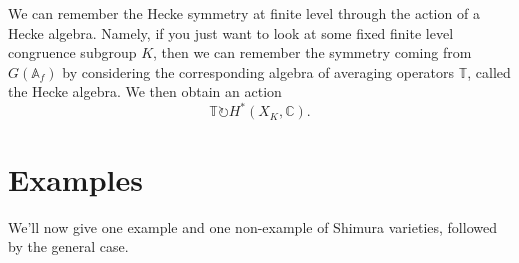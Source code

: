 \documentclass[reqno]{amsart} 
\begin{document}
We can remember the Hecke symmetry at finite level through the action of a Hecke algebra.  Namely, if you just want to look at some fixed finite level congruence subgroup $K$, then we can remember the symmetry coming from $G(\mathbb{A}_f)$ by considering the corresponding algebra of averaging operators $\mathbb{T}$, called the Hecke algebra.  We then obtain an action
\begin{equation*}
  \mathbb{T} \circlearrowright H^\ast(X_K, \mathbb{C}).
\end{equation*}

\section{Examples}

We'll now give one example and one non-example of Shimura varieties, followed by the general case.
\end{document}
